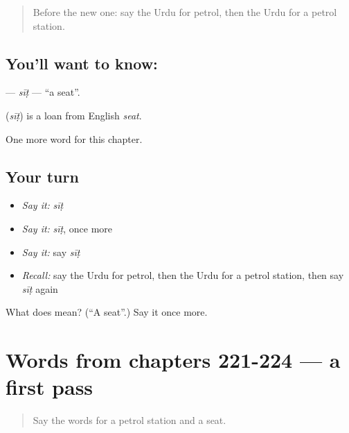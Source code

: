 \label{lesson:UR-C229-sit}



\begin{quote}
Before the new one: say the Urdu for petrol, then the Urdu for a petrol station.
\end{quote}

\subsection*{You'll want to know: }
\textbf{} — \emph{sīṭ} — \textquotedblleft{}a seat\textquotedblright{}.

\begin{cousinweb}
\textbf{} (\emph{sīṭ}) is a loan from English \emph{seat}.
\end{cousinweb}

\begin{grammarlens}[title={What you've built}]
One more word for this chapter.
\end{grammarlens}

\subsection*{Your turn}
\begin{itemize}
\raggedright
  \item \emph{Say it:} \emph{sīṭ}
  \item \emph{Say it:} \emph{sīṭ}, once more
  \item \emph{Say it:} say \emph{sīṭ}
  \item \emph{Recall:} say the Urdu for petrol, then the Urdu for a petrol station, then say \emph{sīṭ} again
\end{itemize}

\begin{tcolorbox}[breakable,colback=teal!4,colframe=teal!35!black,title={Before you move on}]
What does  mean? (\textquotedblleft{}A seat\textquotedblright{}.) Say it once more.
\end{tcolorbox}
\section[(dialogue)]{Words from chapters 221-224 — a first pass}

\label{lesson:UR-R229-first-pass-words-from-chapters-221-224}



\begin{quote}
Say the words for a petrol station and a seat.
\end{quote}

